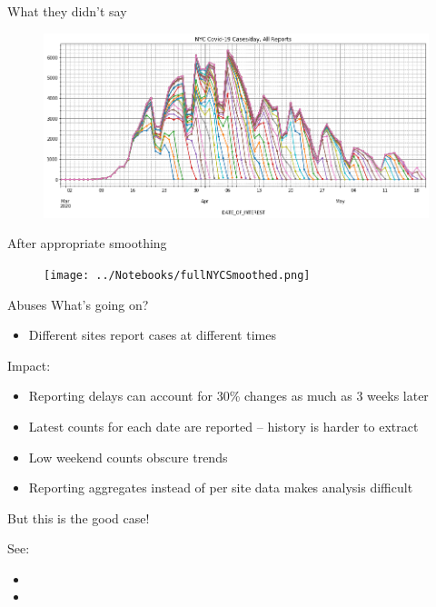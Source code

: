 \documentclass[aspectratio=169]{beamer}
\begin{document}
\begin{frame}{What they didn't say}
  \begin{figure}
    \centering
    \includegraphics[width=1\textwidth]{../Notebooks/theFullStory.png}
  \end{figure}
\end{frame}

\begin{frame}{After appropriate smoothing}
  \begin{figure}
    \centering
    \texttt{[image: ../Notebooks/fullNYCSmoothed.png]}
  \end{figure}

\end{frame}

\begin{frame}{Abuses}
  What's going on?
  \begin{itemize}
  \item Different sites report cases at different times
  \end{itemize}
  
  Impact:
  \begin{itemize}
  \item Reporting delays can account for 30\% changes as much as 3
    weeks later
  \item Latest counts for each date are reported -- history is harder
    to extract
  \item Low weekend counts obscure trends
  \item Reporting aggregates instead of per site data makes analysis difficult
  \end{itemize}

But this is the good case!

See:
\begin{itemize}
\item {}
\item {}
\end{itemize}
\end{frame}
\end{document}
